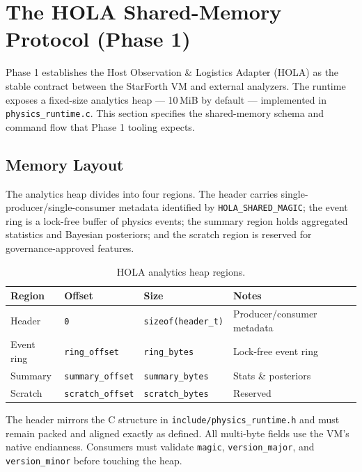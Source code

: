 
\section{The HOLA Shared-Memory Protocol (Phase 1)}

Phase 1 establishes the Host Observation \& Logistics Adapter (HOLA) as the
stable contract between the StarForth VM and external analyzers. The runtime
exposes a fixed-size analytics heap --- 10\,MiB by default --- implemented in
\texttt{physics\_runtime.c}. This section specifies the shared-memory schema and
command flow that Phase 1 tooling expects.

\subsection{Memory Layout}

The analytics heap divides into four regions. The header carries
single-producer/single-consumer metadata identified by
\texttt{HOLA\_SHARED\_MAGIC}; the event ring is a lock-free buffer of physics
events; the summary region holds aggregated statistics and Bayesian posteriors;
and the scratch region is reserved for governance-approved features.

\begin{table}[h]
\centering
\begin{tabular}{llll}
\toprule
Region & Offset & Size & Notes \\
\midrule
Header & \texttt{0} & \texttt{sizeof(header\_t)} & Producer/consumer metadata \\
Event ring & \texttt{ring\_offset} & \texttt{ring\_bytes} & Lock-free event ring \\
Summary & \texttt{summary\_offset} & \texttt{summary\_bytes} & Stats \& posteriors \\
Scratch & \texttt{scratch\_offset} & \texttt{scratch\_bytes} & Reserved \\
\bottomrule
\end{tabular}
\caption{HOLA analytics heap regions.}
\end{table}

The header mirrors the C structure in \texttt{include/physics\_runtime.h} and
must remain packed and aligned exactly as defined. All multi-byte fields use the
VM's native endianness. Consumers must validate \texttt{magic},
\texttt{version\_major}, and \texttt{version\_minor} before touching the heap.


